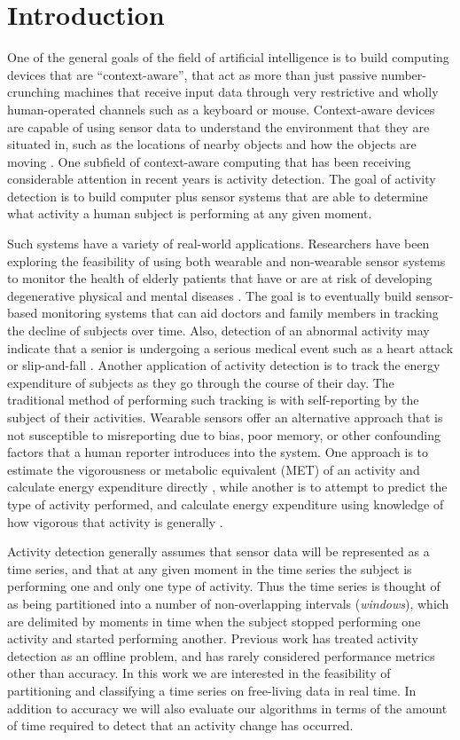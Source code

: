 \chapter{Introduction}
One of the general goals of the field of artificial intelligence is to build
computing devices that are ``context-aware'', that act as
more than just passive number-crunching machines that receive input data through very
restrictive and wholly human-operated channels such as a keyboard or mouse.
Context-aware devices are capable of using sensor data to understand the
environment that they are situated in, such as the locations of nearby objects
and how the objects are moving \cite{abowd99}. One subfield of context-aware
computing that has been receiving considerable attention in recent years is activity
detection. The goal of activity detection is to build computer plus sensor systems
that are able to determine what activity a human subject is performing at any given
moment.

Such systems have a variety of real-world applications. Researchers have been
exploring the feasibility of using both wearable and non-wearable sensor systems to
monitor the health of elderly patients that have or are at risk of developing
degenerative physical and mental diseases \cite{fogarty06}. The goal is to 
eventually build sensor-based monitoring systems that can aid doctors and family
members in tracking the decline of subjects over time. Also, detection of an
abnormal activity may indicate that a senior is undergoing a serious medical
event such as a heart attack or slip-and-fall \cite{wang12}. Another
application of activity detection is to track the energy expenditure
of subjects as they go through the course of their day. The
traditional method of performing such tracking is with self-reporting by the
subject of their activities. Wearable sensors offer an alternative approach that
is not susceptible to misreporting due to bias, poor memory, or other
confounding factors that a human reporter introduces into the system. One
approach is to estimate the vigorousness or metabolic equivalent
(MET) of an activity and calculate energy expenditure directly \cite{staudenmeyer09},
while another is to attempt to predict the type of activity performed, and calculate energy
expenditure using knowledge of how vigorous that activity is generally \cite{trost12}.

Activity detection generally assumes that sensor data will be represented as a
time series, and that at any given moment in the time series the subject is
performing one and only one type of activity. Thus the time series is thought
of as being partitioned into a number of non-overlapping intervals (\emph{windows}), which are
delimited by moments in time when the subject stopped performing one activity
and started performing another. Previous work has treated activity detection as an
offline problem, and has rarely considered performance metrics other than accuracy.
In this work we are interested in the feasibility of partitioning and
classifying a time series on free-living data in real time. In addition to
accuracy we will also evaluate our algorithms in terms of the amount of time
required to detect that an activity change has occurred.

